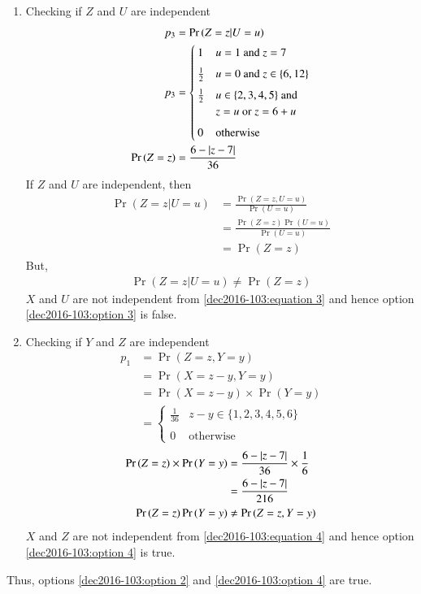 \begin{enumerate}
\item Checking if $Z$ and $U$ are independent
\begin{align}
    p_3 &= \Pr{(Z=z| U=u)}
    \\p_3 &= 
    \begin{cases}
        1 & u=1 \text{ and } z=7\\ ~\\[-1em]
        \frac{1}{2} & u=0 \text{ and } z\in\{6,12\}\\ ~\\[-1em]
        \frac{1}{2} & u\in\{2,3,4,5\}  \text{ and } \\&z=u \text{ or } z=6+u\\ ~\\[-1em]
        0 & \text{otherwise}
    \end{cases}
    \\\Pr{(Z=z)} &= \frac{6 - \left\vert z-7\right\vert}{36}
\end{align}
If $Z$ and $U$ are independent, then
\begin{align}
    \Pr{(Z=z| U=u)} &= \frac{\Pr{(Z=z, U=u)}}{\Pr{(U=u)}}
    \\&= \frac{\Pr{(Z=z)}\Pr{(U=u)}}{\Pr{(U=u)}}
    \\&= \Pr{(Z=z)}
\end{align}
But,
\begin{align}
    \Pr{(Z=z| U=u)} \neq \Pr{(Z=z)} \label{dec2016-103:equation 3}
\end{align}
$X$ and $U$ are not independent from \eqref{dec2016-103:equation 3} and hence option \eqref{dec2016-103:option 3} is false.
\item Checking if $Y$ and $Z$ are independent
\begin{align}
    p_1 &= \Pr{(Z=z, Y=y)}
    \\ &= \Pr{(X=z-y, Y=y)}
    \\ &= \Pr{(X=z-y)} \times \Pr{(Y=y)}
    \\ &= \begin{cases}
        \frac{1}{36} & z-y \in \{1, 2, 3, 4, 5, 6\}\\ ~\\[-1em]
        0 & \text{otherwise}
    \end{cases}
\end{align}
\begin{align}
    \Pr{(Z=z)}\times \Pr{(Y=y)} &= \frac{6 - \left\vert z-7\right\vert}{36} \times \frac{1}{6}
    \\&= \frac{6 - \left\vert z-7\right\vert}{216}
    \\\Pr{(Z=z)}\Pr{(Y=y)} &\neq \Pr{(Z=z, Y=y)}  \label{dec2016-103:equation 4}
\end{align}
$X$ and $Z$ are not independent from \eqref{dec2016-103:equation 4} and hence option \eqref{dec2016-103:option 4} is true.
\end{enumerate}
Thus, options \eqref{dec2016-103:option 2} and \eqref{dec2016-103:option 4} are true.